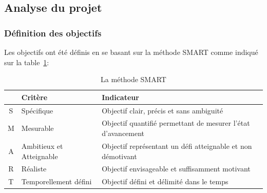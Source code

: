 \documentclass[12pt]{article}
\begin{document}
\subsection{Analyse du projet}

\subsubsection{Définition des objectifs}
Les objectifs ont été définis en se basant sur la méthode SMART comme indiqué sur la table~\ref{tab:SMART}: 
\begin{table} [!h]
 \begin{center}
 \begin{tabular}{|c||l|l|}
 \hline
  & Critère & Indicateur \\
 \hline
 S & Spécifique & Objectif clair, précis et sans ambiguité \\
 \hline
 M & Mesurable & Objectif quantifié permettant de mesurer l'état d'avancement \\
 \hline
 A & Ambitieux et Atteignable & Objectif représentant un défi atteignable et non démotivant \\
 \hline
 R & Réaliste & Objectif envisageable et suffisamment motivant \\
 \hline
 T & Temporellement défini & Objectif défini et délimité dans le temps \\
 \hline
 \end{tabular}
 \end{center}
 \caption{La méthode SMART}
 \label{tab:SMART}
 \end{table}

\newpage
\end{document}
